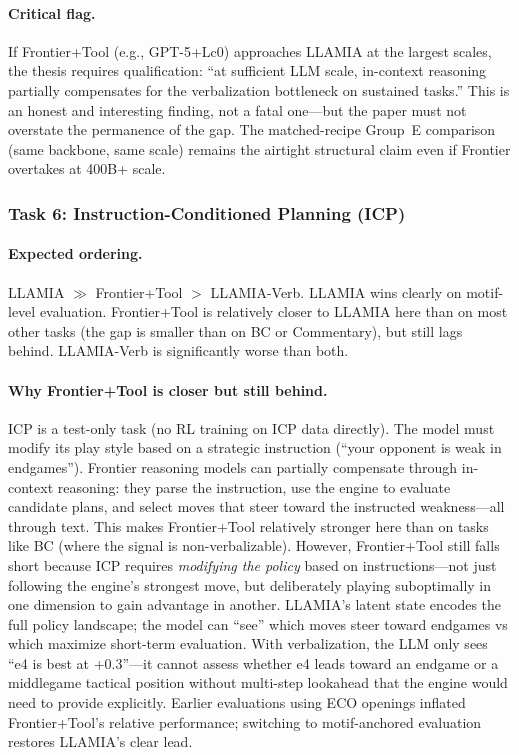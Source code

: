 \paragraph{Critical flag.}
If Frontier+Tool (e.g., GPT-5+Lc0) approaches LLAMIA at the largest
scales, the thesis requires qualification: ``at sufficient LLM
scale, in-context reasoning partially compensates for the
verbalization bottleneck on sustained tasks.'' This is an honest
and interesting finding, not a fatal one---but the paper must not
overstate the permanence of the gap. The matched-recipe Group~E
comparison (same backbone, same scale) remains the airtight
structural claim even if Frontier overtakes at 400B+ scale.

\subsubsection*{Task 6: Instruction-Conditioned Planning (ICP)}
\label{sec:perf_icp}

\paragraph{Expected ordering.}
LLAMIA $\gg$ Frontier+Tool $>$ LLAMIA-Verb. LLAMIA wins clearly
on motif-level evaluation. Frontier+Tool is relatively closer to
LLAMIA here than on most other tasks (the gap is smaller than on
BC or Commentary), but still lags behind. LLAMIA-Verb is
significantly worse than both.

\paragraph{Why Frontier+Tool is closer but still behind.}
ICP is a test-only task (no RL training on ICP data directly). The
model must modify its play style based on a strategic instruction
(``your opponent is weak in endgames''). Frontier reasoning models
can partially compensate through in-context reasoning: they parse
the instruction, use the engine to evaluate candidate plans, and
select moves that steer toward the instructed weakness---all through
text. This makes Frontier+Tool relatively stronger here than on
tasks like BC (where the signal is non-verbalizable). However,
Frontier+Tool still falls short because ICP requires
\emph{modifying the policy} based on instructions---not just
following the engine's strongest move, but deliberately playing
suboptimally in one dimension to gain advantage in another.
LLAMIA's latent state encodes the full policy landscape; the model
can ``see'' which moves steer toward endgames vs which maximize
short-term evaluation. With verbalization, the LLM only sees
``e4 is best at +0.3''---it cannot assess whether e4 leads toward an
endgame or a middlegame tactical position without multi-step
lookahead that the engine would need to provide explicitly.
Earlier evaluations using ECO openings inflated Frontier+Tool's
relative performance; switching to motif-anchored evaluation
restores LLAMIA's clear lead.

